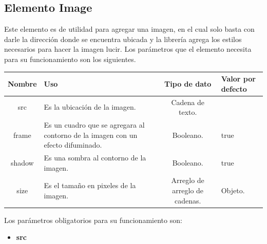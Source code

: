 \subsection{Elemento Image}
Este elemento es de utilidad para agregar una imagen, en el cual solo basta con darle la dirección donde se encuentra ubicada y la librería agrega los estilos necesarios para hacer la imagen lucir.
Los parámetros que el elemento necesita para su funcionamiento son los siguientes.
\newline
    \newline
    \begin{center}
     \begin{tabular}{ | c |  p{5cm}  | c | p{3cm} |} 
     \hline
     \textbf{Nombre} &  \textbf{Uso} &  \textbf{ Tipo de dato} &  \textbf{Valor por defecto}\\ [0.5ex] 
     \hline\hline
     src &  Es la ubicación de la imagen. &   Cadena de texto. & \\  [2.5ex] 
     \hline
     frame &  Es un cuadro que se agregara al contorno de la imagen con un efecto difuminado. &   Booleano. & true \\  [2.5ex] 
     \hline
      shadow &  Es una sombra al contorno de la imagen. &   Booleano. & true \\  [2.5ex] 
     \hline
     size &  Es el tamaño en pixeles de la imagen. &   Arreglo de arreglo de cadenas. & Objeto. \\  [2.5ex] 
     \hline
    \end{tabular}
    \end{center}
    \newline
                \newline
Los parámetros obligatorios para su funcionamiento son:
\begin{itemize}
\item \textbf{src} 
\end{itemize}
\newline
    \newline
